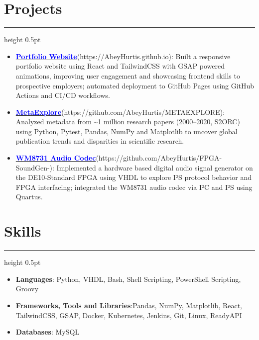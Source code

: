 \documentclass[a4paper]{article}
\newcommand{\tightsection}[1]{
  \vspace{-0.9em}
  \section*{#1}
  \vspace{-0.95em}
  {\color{gray}\hrule height 0.5pt}
  \vspace{0.5em}
}
\begin{document}
\tightsection{Projects}
\begin{itemize}[itemsep=1pt,topsep=1pt]
    \item \href{https://AbeyHurtis.github.io}{\textcolor{blue}{\textbf{Portfolio Website}}}(https://AbeyHurtis.github.io): Built a responsive portfolio website using React and TailwindCSS with GSAP powered animations, improving user engagement and showcasing frontend skills to prospective employers; automated deployment to GitHub Pages using GitHub Actions and CI/CD workflows.
    
    \item \href{https://github.com/AbeyHurtis/METAEXPLORE}{\textcolor{blue}{\textbf{MetaExplore}}}(https://github.com/AbeyHurtis/METAEXPLORE): Analyzed metadata from \textasciitilde1 million research papers (2000–2020, S2ORC) using Python, Pytest, Pandas, NumPy and Matplotlib to uncover global publication trends and disparities in scientific research.

    \item \href{https://github.com/AbeyHurtis/FPGA-SoundGen-}{\textcolor{blue}{\textbf{WM8731 Audio Codec}}}(https://github.com/AbeyHurtis/FPGA-SoundGen-): Implemented a hardware based digital audio signal generator on the DE10-Standard FPGA using VHDL to explore I²S protocol behavior and FPGA interfacing; integrated the WM8731 audio codec via I²C and I²S using Quartus.
\end{itemize}


\tightsection{Skills}
\begin{itemize}[noitemsep,topsep=0pt]
  \item \textbf{Languages}: Python, VHDL, Bash, Shell Scripting, PowerShell Scripting, Groovy
  \item \textbf{Frameworks, Tools and Libraries}:Pandas, NumPy, Matplotlib, React, TailwindCSS, GSAP, Docker, Kubernetes, Jenkins, Git, Linux, ReadyAPI
  \item \textbf{Databases}: MySQL
\end{itemize}
\end{document}
